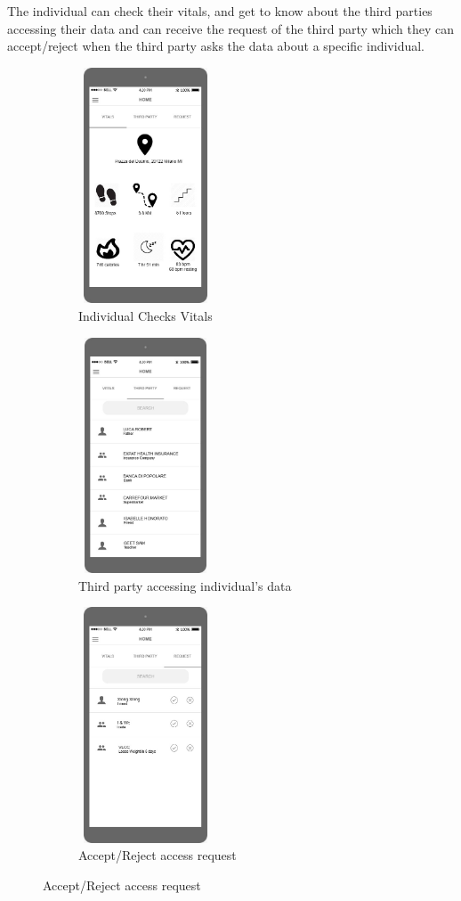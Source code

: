 The individual can check their vitals, and get to know about the third parties accessing their data and can receive the request of the third party which they can accept/reject when the third party asks the data about a specific individual.

\begin{figure}[H]
	\centering
	\begin{subfigure}[b]{0.3\textwidth}	
		\includegraphics[width=4cm,height=7cm]		{./RASD_Mockups/3_I-Home.jpeg}
      	\caption{Individual Checks Vitals}
        \label{TrackMe_vitals}
	 \end{subfigure}
     \begin{subfigure}[b]{0.3\textwidth}	
		\includegraphics[width=4cm,height=7cm]		{./RASD_Mockups/4_I-DetailsOfThirdParty.jpeg}
      	\caption{Third party accessing individual's data}
        \label{TrackMe_3party}
	 \end{subfigure}
     \begin{subfigure}[b]{0.3\textwidth}	
		\includegraphics[width=4cm,height=7cm]		{./RASD_Mockups/5_I-Request.jpeg}
      	\caption{Accept/Reject access request}
        \label{TrackMe_acerej}
	 \end{subfigure}
\end{figure}

